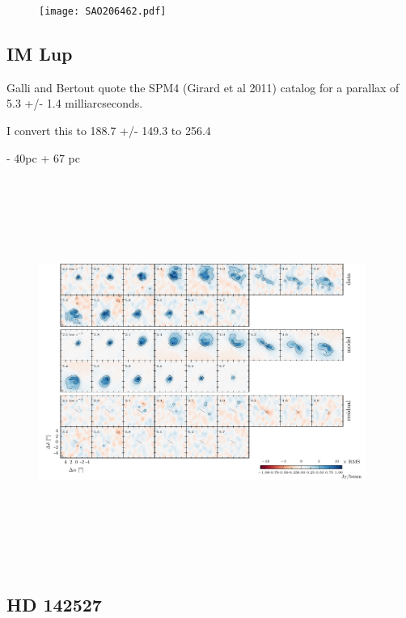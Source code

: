 \documentclass[twocolumn]{aastex6}
\begin{document}
\begin{figure}[htb]
\begin{center}
  \texttt{[image: SAO206462.pdf]}
  \end{center}
\end{figure}

\subsection{IM Lup}

Galli and Bertout quote the SPM4 (Girard et al 2011) catalog for a parallax of 5.3 +/- 1.4 milliarcseconds.

I convert this to 188.7 +/-
149.3 to 256.4

- 40pc + 67 pc

\begin{figure}[htb]
\begin{center}
  \includegraphics[draft, width=0.95\textwidth, height=5in]{IMLup.pdf}
  \end{center}
\end{figure}

\subsection{HD 142527}
\end{document}
